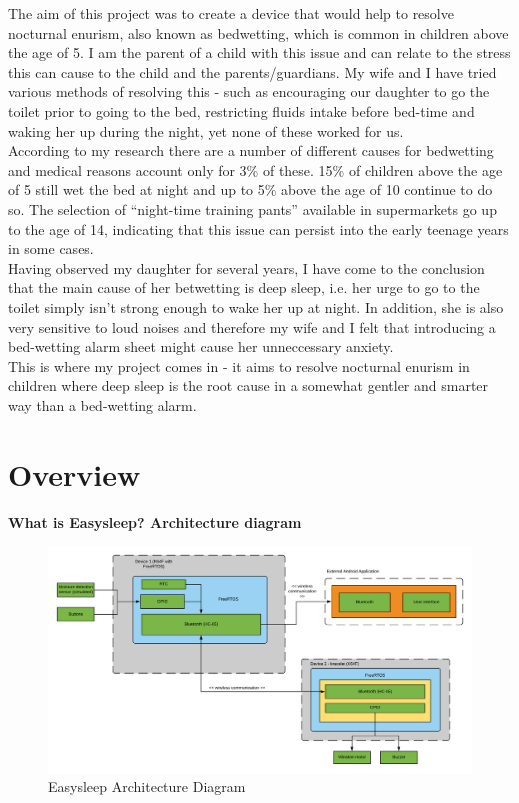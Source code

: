 \documentclass[12pt,a4paper]{article}
\begin{document}
	The aim of this project was to create a device that would help to resolve nocturnal enurism, also known as bedwetting, which is common in children above the age of 5. I am the parent of a child with this issue and can relate to the stress this can cause to the child and the parents/guardians. My wife and I have tried various methods of resolving this - such as encouraging our daughter to go the toilet prior to going to the bed, restricting fluids intake before bed-time and waking her up during the night, yet none of these worked for us.\\
	
	According to my research there are a number of different causes for bedwetting and medical reasons account only for 3\% of these. 15\% of children above the age of 5 still wet the bed at night and up to 5\% above the age of 10 continue to do so. The selection of ``night-time training pants'' available in supermarkets go up to the age of 14, indicating that this issue can persist into the early teenage years in some cases.\\
	
	Having observed my daughter for several years, I have come to the conclusion that the main cause of her betwetting is deep sleep, i.e. her urge to go to the toilet simply isn't strong enough to wake her up at night. In addition, she is also very sensitive to loud noises and therefore my wife and I felt that introducing a bed-wetting alarm sheet might cause her unneccessary anxiety.\\
	
	This is where my project comes in - it aims to resolve nocturnal enurism in children 
	where deep sleep is the root cause in a somewhat gentler and smarter way than a bed-wetting
	alarm. 
	\newpage
	
	\section{Overview}
	{\bfseries What is Easysleep? Architecture diagram}\\
	
	\begin{figure}[h]
	 \centering
	 \includegraphics[width=\textwidth]{moistureDetectionArch.png}
	 \caption{Easysleep Architecture Diagram}
	 \label{fig:easysleepArchitectureDiagram}
	\end{figure}
\end{document}
